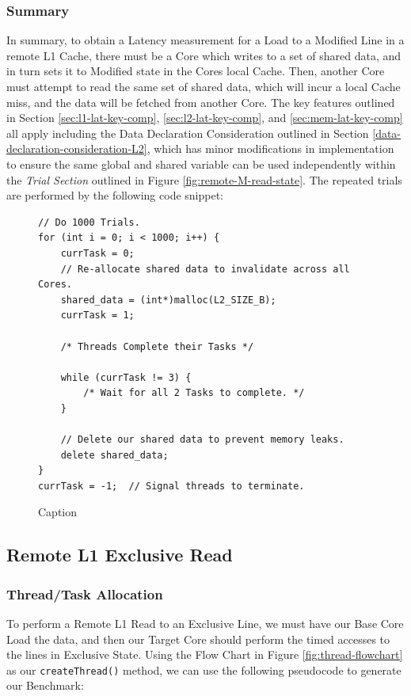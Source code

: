 \documentclass[bsc,frontabs,twoside,singlespacing,parskip,deptreport]{infthesis}     %
\begin{document}
\subsubsection{Summary}
In summary, to obtain a Latency measurement for a Load to a Modified Line in a remote L1 Cache, there must be a Core which writes to a set of shared data, and in turn sets it to Modified state in the Cores local Cache. Then, another Core must attempt to read the same set of shared data, which will incur a local Cache miss, and the data will be fetched from another Core. The key features outlined in Section \ref{sec:l1-lat-key-comp}, \ref{sec:l2-lat-key-comp}, and \ref{sec:mem-lat-key-comp} all apply including the Data Declaration Consideration outlined in Section \ref{data-declaration-consideration-L2}, which has minor modifications in implementation to ensure the same global and shared variable can be used independently within the \textit{Trial Section} outlined in Figure \ref{fig:remote-M-read-state}. The repeated trials are performed by the following code snippet:
\begin{figure}[!h]
    \centering
    \begin{minipage}{0.8\textwidth}
    \begin{verbatim}
// Do 1000 Trials.
for (int i = 0; i < 1000; i++) {
    currTask = 0;
    // Re-allocate shared data to invalidate across all Cores.
    shared_data = (int*)malloc(L2_SIZE_B);
    currTask = 1;

    /* Threads Complete their Tasks */
        
    while (currTask != 3) {
        /* Wait for all 2 Tasks to complete. */
    }

    // Delete our shared data to prevent memory leaks.
    delete shared_data;
}
currTask = -1;  // Signal threads to terminate.
    \end{verbatim}
    \end{minipage}
    \caption{Caption}
    \label{fig:remote-M-repeat}
\end{figure}


\subsection{Remote L1 Exclusive Read}
\subsubsection{Thread/Task Allocation}
To perform a Remote L1 Read to an Exclusive Line, we must have our Base Core Load the data, and then our Target Core should perform the timed accesses to the lines in Exclusive State. Using the Flow Chart in Figure \ref{fig:thread-flowchart} as our \texttt{createThread()} method, we can use the following pseudocode to generate our Benchmark:
\end{document}
